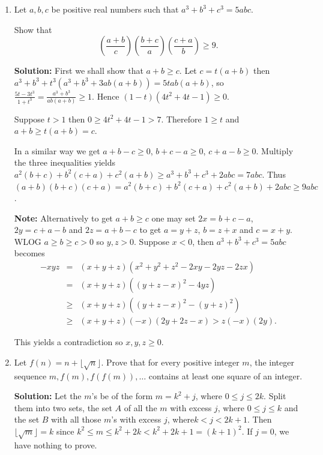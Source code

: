 \documentclass{article}
\newcommand{\solution}[1]{%
\ifsolutions%
    \textbf{Solution: } #1
\fi
}
\begin{document}
\begin{enumerate}
\item Let $a, b, c$ be positive real numbers such that $a^3 + b^3 + c^3 = 5abc$.

Show that
\[
    \left( \frac{a + b}{c} \right) \left( \frac{b + c}{a} \right) \left( \frac{c + a}{b} \right) \geq 9.
\]

\solution{First we shall show that $a + b \geq c$. Let $c = t(a + b)$ then $a^3 + b^3 + t^3 (a^3 + b^3 + 3ab(a + b)) = 5tab(a + b)$, so $\frac{5t - 3t^3}{1 + t^3} = \frac{a^3 + b^3}{ab(a + b)} \geq 1$. Hence $(1 - t)(4t^2 + 4t - 1) \geq 0$.

Suppose $t > 1$ then $0 \geq 4t^2 + 4t - 1 > 7$. Therefore $1 \geq t$ and $a + b \geq t(a + b) = c$.

In a similar way we get $a + b - c \geq 0$, $b + c - a \geq 0$, $c + a - b \geq 0$. Multiply the three inequalities yields $a^2 (b + c) + b^2 (c + a) + c^2 ( a + b) \geq a^3 + b^3 + c^3 + 2abc = 7abc$. Thus $(a + b) (b + c) (c + a) = a^2 (b + c) + b^2 (c + a) + c^2 (a + b) + 2abc \geq 9abc$.

\textbf{Note:} Alternatively to get $a + b \geq c$ one may set $2x = b + c - a$, $2y = c + a - b$ and $2z = a + b - c$ to get $a = y + z$, $b = z + x$ and $c = x + y$. WLOG $a \geq b \geq c > 0$ so $y, z > 0$. Suppose $x < 0$, then $a^3 + b^3 + c^3 = 5abc$ becomes
\begin{align*}
    -xyz & = & (x + y + z)(x^2 + y^2 + z^2 - 2xy - 2yz - 2zx) \\
         & = & (x + y + z)({(y + z - x)}^2 - 4yz) \\
         & \geq & (x + y + z)({(y + z - x)}^2 - {(y + z)}^2) \\
         & \geq & (x + y + z)(-x)(2y + 2z - x) > z(-x)(2y).
\end{align*}

This yields a contradiction so $x, y, z \geq 0$.}

\item Let $f(n) = n + \lfloor \sqrt{n} \rfloor$. Prove that for every positive integer $m$, the integer sequence $m, f(m), f(f(m)), \dots$ contains at least one square of an integer.

\solution{Let the $m$'s be of the form $m = k^2 + j$, where $0 \leq j \leq 2k$. Split them into two sets, the set $A$ of all the $m$ with excess $j$, where $0 \leq j \leq k$ and the set $B$ with all those $m$'s with excess $j$, where$k < j < 2k + 1$. Then $\lfloor \sqrt{m} \rfloor = k$ since $k^2 \leq m \leq k^2 + 2k < k^2 + 2k + 1 = {(k + 1)}^2$. If $j = 0$, we have nothing to prove.

}
\end{enumerate}
\end{document}

